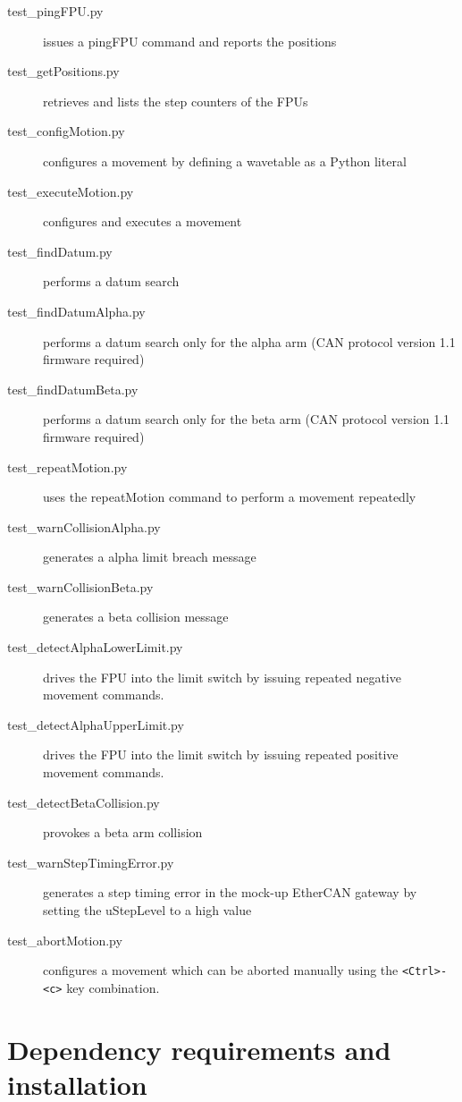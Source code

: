 \documentclass[11pt,a4paper]{report}
\begin{document}
\begin{description}
\item[test\_pingFPU.py] issues a pingFPU command and reports the positions
\item[test\_getPositions.py] retrieves and lists the step counters of the FPUs
\item[test\_configMotion.py] configures a movement by defining a wavetable as a Python literal
\item[test\_executeMotion.py] configures and executes a movement
\item[test\_findDatum.py] performs a datum search
\item[test\_findDatumAlpha.py] performs a datum search only for the alpha arm (CAN protocol version 1.1 firmware required)
\item[test\_findDatumBeta.py] performs a datum search only for the beta arm (CAN protocol version 1.1 firmware required)
\item[test\_repeatMotion.py] uses the repeatMotion command to perform a movement repeatedly
\item[test\_warnCollisionAlpha.py] generates a alpha limit breach message
\item[test\_warnCollisionBeta.py] generates a beta collision message
\item[test\_detectAlphaLowerLimit.py] drives the FPU into the limit switch by issuing repeated negative movement commands.
\item[test\_detectAlphaUpperLimit.py] drives the FPU into the limit switch by issuing repeated positive movement commands.
\item[test\_detectBetaCollision.py] provokes a beta arm collision
\item[test\_warnStepTimingError.py] generates a step timing error
  in the mock-up EtherCAN gateway by setting the uStepLevel to a high
  value  
\item[test\_abortMotion.py]  configures a movement which can be aborted
  manually using the \verb+<Ctrl>-<c>+ key combination.
\end{description}

\section{Dependency requirements and installation}
\label{sec:installationfromscratch}
\end{document}
